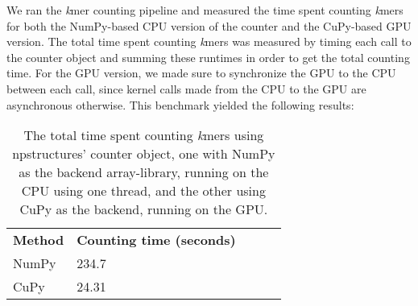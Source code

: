 We ran the \textit{k}mer counting pipeline and measured the time spent counting \textit{k}mers for both the NumPy-based CPU version of the counter and the CuPy-based GPU version.
The total time spent counting \textit{k}mers was measured by timing each call to the counter object and summing these runtimes in order to get the total counting time.
For the GPU version, we made sure to synchronize the GPU to the CPU between each call, since kernel calls made from the CPU to the GPU are asynchronous otherwise.
This benchmark yielded the following results: 

\begin{table}[H]
\begin{center}
\begin{tabular}{lllll}
\multicolumn{1}{l|}{\textbf{Method}} & \multicolumn{1}{l}{\textbf{Counting time (seconds)}} &  \\ \cline{1-2}
\multicolumn{1}{l|}{NumPy} & \multicolumn{1}{l}{234.7} &  \\
\multicolumn{1}{l|}{CuPy} & \multicolumn{1}{l}{24.31}
\end{tabular}
\end{center}
\caption{
  The total time spent counting \textit{k}mers using npstructures' counter object, one with NumPy as the backend array-library, running on the CPU using one thread, and the other using CuPy as the backend, running on the GPU.
}
\label{methods:preliminary_testing:tables:benchmark}
\end{table}

